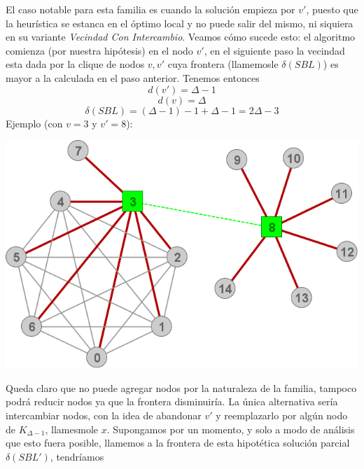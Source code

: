 El caso notable para esta familia es cuando la soluci\'on empieza por $v'$, puesto 
que la heur\'istica se estanca en el \'optimo local y no puede salir del mismo, ni siquiera
en su variante \emph{Vecindad Con Intercambio}. Veamos c\'omo sucede esto: el 
algoritmo comienza (por nuestra hip\'otesis) en el nodo $v'$, en el siguiente paso
la vecindad esta dada por la clique de nodos $v, v'$ cuya frontera (llamemosle 
$\delta(SBL)$) es mayor a la calculada en el paso anterior. Tenemos entonces
\[ d(v') = \Delta -1 \]
\[ d(v) = \Delta \]
\[ \delta(SBL) = (\Delta -1) -1 + \Delta -1 = 2 \Delta -3 \]
Ejemplo (con $v=3$ y $v'=8$):
\begin{center}
	\includegraphics[scale = 0.3]{img/ej3/busqueda_local/estrellaCMF_st02.png} \\
\end{center}

Queda claro que no puede agregar nodos por la naturaleza de la familia, 
tampoco podr\'a reducir nodos ya que la frontera disminuir\'ia. La \'unica
alternativa ser\'ia intercambiar nodos, con la idea de abandonar $v'$ y 
reemplazarlo por alg\'un nodo de $K_{\Delta -1}$, llamesmole $x$. 
Supongamos por un momento, 
y solo a modo de an\'alisis que esto fuera posible, llamemos a la frontera
de esta hipot\'etica soluci\'on parcial $\delta(SBL')$, tendr\'iamos

